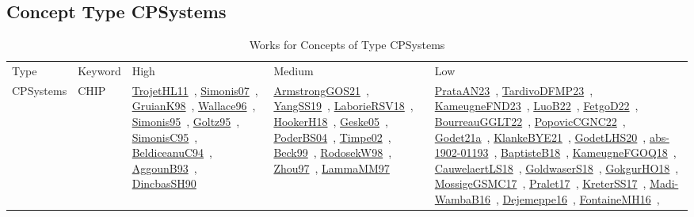 \clearpage
\subsection{Concept Type CPSystems}
\label{sec:CPSystems}
{\scriptsize
\begin{longtable}{lp{3cm}>{\raggedright\arraybackslash}p{6cm}>{\raggedright\arraybackslash}p{6cm}>{\raggedright\arraybackslash}p{8cm}}
\rowcolor{white}\caption{Works for Concepts of Type CPSystems}\\ \toprule
\rowcolor{white}Type & Keyword & High & Medium & Low\\ \midrule\endhead
\bottomrule
\endfoot
CPSystems & CHIP & \href{works/TrojetHL11.pdf}{TrojetHL11}~\cite{TrojetHL11}, \href{works/Simonis07.pdf}{Simonis07}~\cite{Simonis07}, \href{works/GruianK98.pdf}{GruianK98}~\cite{GruianK98}, \href{works/Wallace96.pdf}{Wallace96}~\cite{Wallace96}, \href{works/Simonis95.pdf}{Simonis95}~\cite{Simonis95}, \href{works/Goltz95.pdf}{Goltz95}~\cite{Goltz95}, \href{works/SimonisC95.pdf}{SimonisC95}~\cite{SimonisC95}, \href{works/BeldiceanuC94.pdf}{BeldiceanuC94}~\cite{BeldiceanuC94}, \href{works/AggounB93.pdf}{AggounB93}~\cite{AggounB93}, \href{works/DincbasSH90.pdf}{DincbasSH90}~\cite{DincbasSH90} & \href{works/ArmstrongGOS21.pdf}{ArmstrongGOS21}~\cite{ArmstrongGOS21}, \href{works/YangSS19.pdf}{YangSS19}~\cite{YangSS19}, \href{works/LaborieRSV18.pdf}{LaborieRSV18}~\cite{LaborieRSV18}, \href{works/HookerH18.pdf}{HookerH18}~\cite{HookerH18}, \href{works/Geske05.pdf}{Geske05}~\cite{Geske05}, \href{works/PoderBS04.pdf}{PoderBS04}~\cite{PoderBS04}, \href{works/Timpe02.pdf}{Timpe02}~\cite{Timpe02}, \href{works/Beck99.pdf}{Beck99}~\cite{Beck99}, \href{works/RodosekW98.pdf}{RodosekW98}~\cite{RodosekW98}, \href{works/Zhou97.pdf}{Zhou97}~\cite{Zhou97}, \href{works/LammaMM97.pdf}{LammaMM97}~\cite{LammaMM97} & \href{works/PrataAN23.pdf}{PrataAN23}~\cite{PrataAN23}, \href{works/TardivoDFMP23.pdf}{TardivoDFMP23}~\cite{TardivoDFMP23}, \href{works/KameugneFND23.pdf}{KameugneFND23}~\cite{KameugneFND23}, \href{works/LuoB22.pdf}{LuoB22}~\cite{LuoB22}, \href{works/FetgoD22.pdf}{FetgoD22}~\cite{FetgoD22}, \href{works/BourreauGGLT22.pdf}{BourreauGGLT22}~\cite{BourreauGGLT22}, \href{works/PopovicCGNC22.pdf}{PopovicCGNC22}~\cite{PopovicCGNC22}, \href{works/Godet21a.pdf}{Godet21a}~\cite{Godet21a}, \href{works/KlankeBYE21.pdf}{KlankeBYE21}~\cite{KlankeBYE21}, \href{works/GodetLHS20.pdf}{GodetLHS20}~\cite{GodetLHS20}, \href{works/abs-1902-01193.pdf}{abs-1902-01193}~\cite{abs-1902-01193}, \href{works/BaptisteB18.pdf}{BaptisteB18}~\cite{BaptisteB18}, \href{works/KameugneFGOQ18.pdf}{KameugneFGOQ18}~\cite{KameugneFGOQ18}, \href{works/CauwelaertLS18.pdf}{CauwelaertLS18}~\cite{CauwelaertLS18}, \href{works/GoldwaserS18.pdf}{GoldwaserS18}~\cite{GoldwaserS18}, \href{works/GokgurHO18.pdf}{GokgurHO18}~\cite{GokgurHO18}, \href{works/MossigeGSMC17.pdf}{MossigeGSMC17}~\cite{MossigeGSMC17}, \href{works/Pralet17.pdf}{Pralet17}~\cite{Pralet17}, \href{works/KreterSS17.pdf}{KreterSS17}~\cite{KreterSS17}, \href{works/Madi-WambaB16.pdf}{Madi-WambaB16}~\cite{Madi-WambaB16}, \href{works/Dejemeppe16.pdf}{Dejemeppe16}~\cite{Dejemeppe16}, \href{works/FontaineMH16.pdf}{FontaineMH16}~\cite{FontaineMH16}, 
\end{longtable}}
